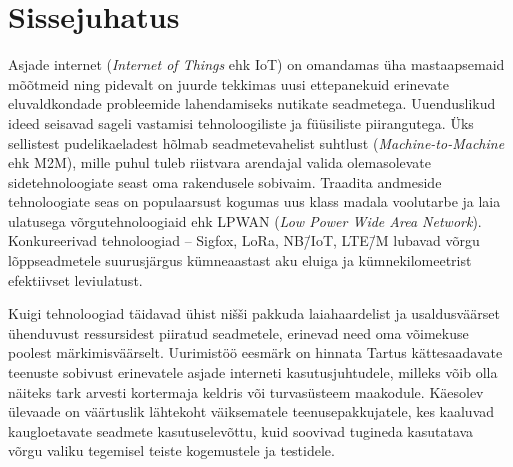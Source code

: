 \documentclass[12pt]{article}
\newcommand{\TODO}{\todo[inline]}
\begin{document}
    {\EngInfo}{\EstInfo}


    \newpage
    \setlength{\parskip}{0em}
    \tableofcontents
    \setlength{\parskip}{1em}



    \newpage


    \section*{Sissejuhatus}


    Asjade internet (\textit{Internet of Things} ehk IoT) on omandamas üha mastaapsemaid mõõtmeid ning pidevalt on juurde tekkimas uusi ettepanekuid erinevate eluvaldkondade probleemide lahendamiseks nutikate seadmetega.
    Uuenduslikud ideed seisavad sageli vastamisi tehnoloogiliste ja füüsiliste piirangutega.
    Üks sellistest pudelikaeladest hõlmab seadmetevahelist suhtlust (\textit{Machine-to-Machine} ehk M2M), mille puhul tuleb riistvara arendajal valida olemasolevate sidetehnoloogiate seast oma rakendusele sobivaim.
    Traadita andmeside tehnoloogiate seas on populaarsust kogumas uus klass madala voolutarbe ja laia ulatusega võrgutehnoloogiaid ehk LPWAN (\textit{Low Power Wide Area Network}).
    Konkureerivad tehnoloogiad -- Sigfox, LoRa, NB\=/IoT, LTE\=/M lubavad võrgu lõppseadmetele suurusjärgus kümneaastast aku eluiga ja kümnekilomeetrist efektiivset leviulatust.

    Kuigi tehnoloogiad täidavad ühist nišši pakkuda laiahaardelist ja usaldusväärset ühenduvust ressursidest piiratud seadmetele, erinevad need oma võimekuse poolest märkimisväärselt.
    Uurimistöö eesmärk on hinnata Tartus kättesaadavate teenuste sobivust erinevatele asjade interneti kasutusjuhtudele, milleks võib olla näiteks tark arvesti kortermaja keldris või turvasüsteem maakodule.
    Käesolev ülevaade on väärtuslik lähtekoht väiksematele teenusepakkujatele, kes kaaluvad kaugloetavate seadmete kasutuselevõttu, kuid soovivad tugineda kasutatava võrgu valiku tegemisel teiste kogemustele ja testidele.
\end{document}

